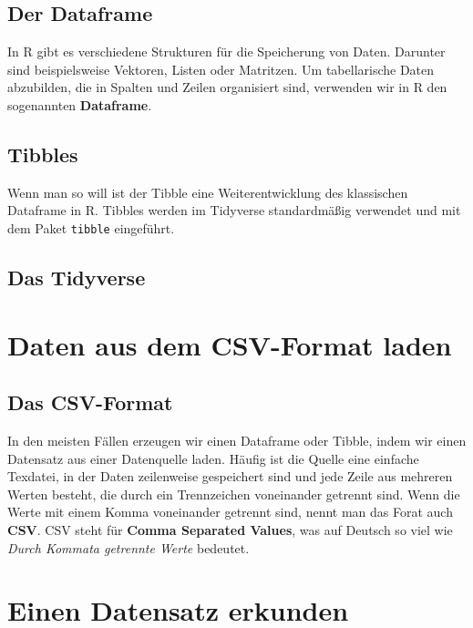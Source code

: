 \documentclass[
]{book}
\begin{document}
\hypertarget{der-dataframe}{%
\section{Der Dataframe}\label{der-dataframe}}

In R gibt es verschiedene Strukturen für die Speicherung von Daten. Darunter sind beispielsweise Vektoren, Listen oder Matritzen. Um tabellarische Daten abzubilden, die in Spalten und Zeilen organisiert sind, verwenden wir in R den sogenannten \textbf{Dataframe}.

\hypertarget{tibbles}{%
\section{Tibbles}\label{tibbles}}

Wenn man so will ist der Tibble eine Weiterentwicklung des klassischen Dataframe in R. Tibbles werden im Tidyverse standardmäßig verwendet und mit dem Paket \texttt{tibble} eingeführt.

\hypertarget{das-tidyverse}{%
\section{Das Tidyverse}\label{das-tidyverse}}

\hypertarget{daten-aus-dem-csv-format-laden}{%
\chapter{Daten aus dem CSV-Format laden}\label{daten-aus-dem-csv-format-laden}}

\hypertarget{das-csv-format}{%
\section{Das CSV-Format}\label{das-csv-format}}

In den meisten Fällen erzeugen wir einen Dataframe oder Tibble, indem wir einen Datensatz aus einer Datenquelle laden. Häufig ist die Quelle eine einfache Texdatei, in der Daten zeilenweise gespeichert sind und jede Zeile aus mehreren Werten besteht, die durch ein Trennzeichen voneinander getrennt sind. Wenn die Werte mit einem Komma voneinander getrennt sind, nennt man das Forat auch \textbf{CSV}. CSV steht für \textbf{Comma Separated Values}, was auf Deutsch so viel wie \emph{Durch Kommata getrennte Werte} bedeutet.

\hypertarget{einen-datensatz-erkunden}{%
\chapter{Einen Datensatz erkunden}\label{einen-datensatz-erkunden}}
\end{document}
